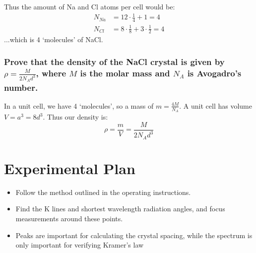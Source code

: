 \documentclass[a4paper]{scrartcl}
\begin{document}
Thus the amount of Na and Cl atoms per cell would be:
\begin{align*}
    N_{Na} &= 12 \cdot \frac{1}{4} + 1 = 4 \\
    N_{Cl} &= 8 \cdot \frac{1}{8} + 3 \cdot \frac{1}{2} = 4
\end{align*}
...which is 4 `molecules' of NaCl.

\subsubsection{Prove that the density of the NaCl crystal is given by \(\rho = \frac{M}{2 N_A d^3}\), where \(M\) is the molar mass and \(N_A\) is Avogadro's number.}
In a unit cell, we have 4 `molecules', so a mass of \(m = \frac{4 M}{N_A}\). A unit cell has volume \(V = a^3 = 8 d^3\). Thus our density is:
\[\rho = \frac{m}{V} = \frac{M}{2 N_A d^3}\]

\section{Experimental Plan}
\begin{itemize}
    \item Follow the method outlined in the operating instructions.
    \item Find the K lines and shortest wavelength radiation angles, and focus measurements around these points.
    \item Peaks are important for calculating the crystal spacing, while the spectrum is only important for verifying Kramer's law
\end{itemize}
\end{document}
